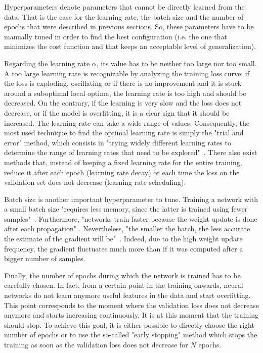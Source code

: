 \setlength{\marginparwidth}{3cm}\leavevmode {}Hyperparameters denote parameters that cannot be directly learned from the data. That is the case for the learning rate, the batch size and the number of epochs that were described in previous sections. So, these parameters have to be manually tuned in order to find the best configuration (i.e. the one that minimizes the cost function and that keeps an acceptable level of generalization).

Regarding the learning rate $\alpha$, its value has to be neither too large nor too small. A too large learning rate is recognizable by analyzing the training loss curve: if the loss is exploding, oscillating or if there is no improvement and it is stuck around a suboptimal local optima, the learning rate is too high and should be decreased. On the contrary, if the learning is very slow and the loss does not decrease, or if the model is overfitting, it is a clear sign that it should be increased. The learning rate can take a wide range of values. Consequently, the most used technique to find the optimal learning rate is simply the "trial and error" method, which consists in "trying widely different learning rates to determine the range of learning rates that need to be explored"~\cite{28}. There also exist methods that, instead of keeping a fixed learning rate for the entire training, reduce it after each epoch (learning rate decay) or each time the loss on the validation set does not decrease (learning rate scheduling).

Batch size is another important hyperparameter to tune. Training a network with a small batch size "requires less memory, since the latter is trained using fewer samples"~\cite{29}. Furthermore, "networks train faster because the weight update is done after each propagation" \cite{29}. Nevertheless, "the smaller the batch, the less accurate the estimate of the gradient will be"~\cite{29}. Indeed, due to the high weight update frequency, the gradient fluctuates much more than if it was computed after a bigger number of samples.

Finally, the number of epochs during which the network is trained has to be carefully chosen. In fact, from a certain point in the training onwards, neural networks do not learn anymore useful features in the data and start overfitting. This point corresponds to the moment where the validation loss does not decrease anymore and starts increasing continuously. It is at this moment that the training should stop. To achieve this goal, it is either possible to directly choose the right number of epochs or to use the so-called "early stopping" method which stops the training as soon as the validation loss does not decrease for $N$ epochs.


